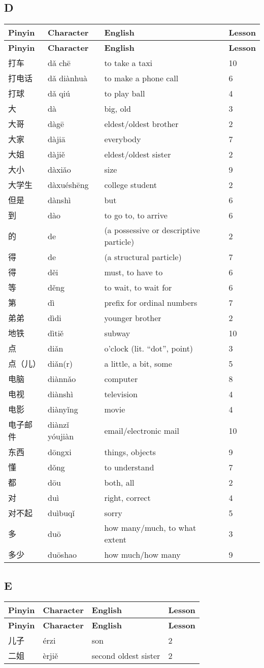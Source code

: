 \documentclass[12pt]{article}
\newcommand{\vocabitem}[4]{%
  #1 & #2 & #3 & #4 \\ \midrule
}
\begin{document}
\subsection*{D}
\begin{longtable}{P{\dimexpr\textwidth/4\relax}P{\dimexpr\textwidth/4\relax}P{\dimexpr\textwidth/4\relax}P{\dimexpr\textwidth/4\relax}}
\toprule
\textbf{Pinyin} & \textbf{Character} & \textbf{English} & \textbf{Lesson} \\
\midrule
\endfirsthead
\toprule
\textbf{Pinyin} & \textbf{Character} & \textbf{English} & \textbf{Lesson} \\
\midrule
\endhead
\vocabitem{打车}{dǎ chē}{to take a taxi}{10}
\vocabitem{打电话}{dǎ diànhuà}{to make a phone call}{6}
\vocabitem{打球}{dǎ qiú}{to play ball}{4}
\vocabitem{大}{dà}{big, old}{3}
\vocabitem{大哥}{dàgē}{eldest/oldest brother}{2}
\vocabitem{大家}{dàjiā}{everybody}{7}
\vocabitem{大姐}{dàjiě}{eldest/oldest sister}{2}
\vocabitem{大小}{dàxiǎo}{size}{9}
\vocabitem{大学生}{dàxuéshēng}{college student}{2}
\vocabitem{但是}{dànshì}{but}{6}
\vocabitem{到}{dào}{to go to, to arrive}{6}
\vocabitem{的}{de}{(a possessive or descriptive particle)}{2}
\vocabitem{得}{de}{(a structural particle)}{7}
\vocabitem{得}{děi}{must, to have to}{6}
\vocabitem{等}{děng}{to wait, to wait for}{6}
\vocabitem{第}{dì}{prefix for ordinal numbers}{7}
\vocabitem{弟弟}{dìdi}{younger brother}{2}
\vocabitem{地铁}{dìtiě}{subway}{10}
\vocabitem{点}{diǎn}{o'clock (lit. “dot”, point)}{3}
\vocabitem{点（儿）}{diǎn(r)}{a little, a bit, some}{5}
\vocabitem{电脑}{diànnǎo}{computer}{8}
\vocabitem{电视}{diànshì}{television}{4}
\vocabitem{电影}{diànyǐng}{movie}{4}
\vocabitem{电子邮件}{diànzǐ yóujiàn}{email/electronic mail}{10}
\vocabitem{东西}{dōngxi}{things, objects}{9}
\vocabitem{懂}{dǒng}{to understand}{7}
\vocabitem{都}{dōu}{both, all}{2}
\vocabitem{对}{duì}{right, correct}{4}
\vocabitem{对不起}{duìbuqǐ}{sorry}{5}
\vocabitem{多}{duō}{how many/much, to what extent}{3}
\vocabitem{多少}{duōshao}{how much/how many}{9}
\end{longtable}

\subsection*{E}
\begin{longtable}{P{\dimexpr\textwidth/4\relax}P{\dimexpr\textwidth/4\relax}P{\dimexpr\textwidth/4\relax}P{\dimexpr\textwidth/4\relax}}
\toprule
\textbf{Pinyin} & \textbf{Character} & \textbf{English} & \textbf{Lesson} \\
\midrule
\endfirsthead
\toprule
\textbf{Pinyin} & \textbf{Character} & \textbf{English} & \textbf{Lesson} \\
\midrule
\endhead
\vocabitem{儿子}{érzi}{son}{2}
\vocabitem{二姐}{èrjiě}{second oldest sister}{2}
\end{longtable}
\end{document}
